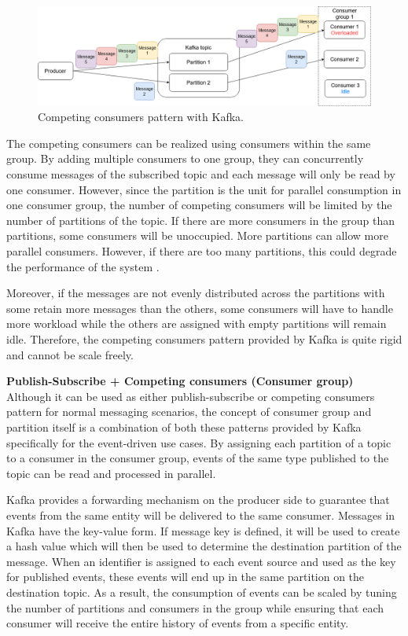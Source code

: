 \begin{figure}[h]
	\centering
	\includegraphics[width=\linewidth]{images/competing-consumers-kafka.png}
	\caption{Competing consumers pattern with Kafka.}
	\label{fig:kafkacompetingconsumer}
\end{figure}
The competing consumers can be realized using consumers within the same group. By adding multiple consumers to one group, they can concurrently consume messages of the subscribed topic and each message will only be read by one consumer. However, since the partition is the unit for parallel consumption in one consumer group, the number of competing consumers will be limited by the number of partitions of the topic. If there are more consumers in the group than partitions, some consumers will be unoccupied. More partitions can allow more parallel consumers. However, if there are too many partitions, this could degrade the performance of the system \cite{kafkapartitionsnum}.

Moreover, if the messages are not evenly distributed across the partitions with some retain more messages than the others, some consumers will have to handle more workload while the others are assigned with empty partitions will remain idle. Therefore, the competing consumers pattern provided by Kafka is quite rigid and cannot be scale freely.

\textbf{Publish-Subscribe + Competing consumers (Consumer group)}\\
Although it can be used as either publish-subscribe or competing consumers pattern for normal messaging scenarios, the concept of consumer group and partition itself is a combination of both these patterns provided by Kafka specifically for the event-driven use cases. By assigning each partition of a topic to a consumer in the consumer group, events of the same type published to the topic can be read and processed in parallel. 

Kafka provides a forwarding mechanism on the producer side to guarantee that events from the same entity will be delivered to the same consumer. Messages in Kafka have the key-value form. If message key is defined, it will be used to create a hash value which will then be used to determine the destination partition of the message. When an identifier is assigned to each event source and used as the key for published events, these events will end up in the same partition on the destination topic. As a result, the consumption of events can be scaled by tuning the number of partitions and consumers in the group while ensuring that each consumer will receive the entire history of events from a specific entity.  

